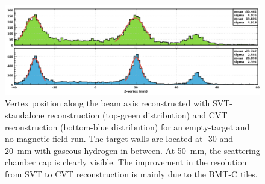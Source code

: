 \begin{figure}[htb]
 \includegraphics[width=2.0\columnwidth,keepaspectratio]{images/NIM_SVTvsCVT.png}
 \caption{Vertex position along the beam axis reconstructed with SVT-standalone reconstruction (top-green distribution) and CVT reconstruction (bottom-blue distribution) for an empty-target and no magnetic field run. The target walls are located at -30 and 20~mm with gaseous hydrogen in-between. At 50~mm, the scattering chamber cap is clearly visible. The improvement in the resolution from SVT to CVT reconstruction is mainly due to the BMT-C tiles.}
 \label{fig:mm-zvertex}
\end{figure}
